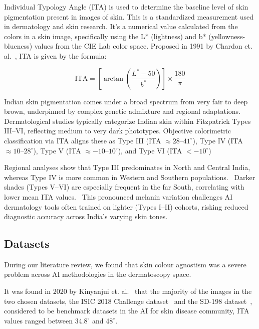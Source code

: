Individual Typology Angle (ITA) is used to determine the baseline level of skin pigmentation present in images of skin. This is a standardized measurement used in dermatology and skin research. It's a numerical value calculated from the colors in a skin image, specifically using the L* (lightness) and b* (yellowness-blueness) values from the CIE Lab color space. Proposed in 1991 by Chardon et. al.~\cite{chardon}, ITA is given by the formula: \par

\begin{equation}
    \text{ITA} = \left[\arctan\left(\frac{L^* - 50}{b^*}\right)\right] \times \frac{180}{\pi}
\end{equation}

Indian skin pigmentation comes under a broad spectrum from very fair to deep brown, underpinned by complex genetic admixture and regional adaptations.~\cite{nov} 
Dermatological studies typically categorize Indian skin within Fitzpatrick Types III--VI, reflecting medium to very dark phototypes. 
Objective colorimetric classification via ITA aligns these as Type III (ITA $\approx 28$--$41^\circ$), Type IV (ITA $\approx 10$--$28^\circ$), Type V (ITA $\approx -10$--$10^\circ$), and Type VI (ITA $< -10^\circ$)~\cite{nov} \par

Regional analyses show that Type III predominates in North and Central India,  whereas Type IV is more common in Western and Southern populations.~\cite{sarangi} Darker shades (Types V–VI) are especially frequent in the far South, correlating with lower mean ITA values.~\cite{nov} This pronounced melanin variation challenges AI dermatology tools often trained on lighter (Types I–II) cohorts, risking reduced diagnostic accuracy across India’s varying skin tones.

\subsection{Datasets}

During our literature review, we found that skin colour agnostism was a severe problem across AI methodologies in the dermatoscopy space.

It was found in 2020 by Kinyanjui et. al.~\cite{kinnie} that the majority of the images in the two chosen datasets, the ISIC 2018 Challenge dataset~\cite{isic2018} and the SD-198 dataset~\cite{sun}, considered to be benchmark datasets in the AI for skin disease community, ITA values ranged between $34.8^\circ$ and $48^\circ$. \par

